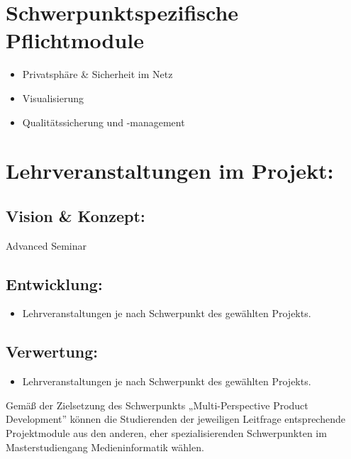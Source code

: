 \section*{Schwerpunktspezifische
Pflichtmodule}\label{schwerpunktspezifische-pflichtmodule-1}

\begin{itemize}
\item
  Privatsphäre \& Sicherheit im Netz
\item
  Visualisierung
\item
  Qualitätssicherung und -management
\end{itemize}

\section*{Lehrveranstaltungen im
Projekt:}\label{lehrveranstaltungen-im-projekt-1}

\subsection*{Vision \& Konzept:}\label{vision-konzept-1}

Advanced Seminar

\subsection*{Entwicklung:}\label{entwicklung-1}

\begin{itemize}
\tightlist
\item
  Lehrveranstaltungen je nach Schwerpunkt des gewählten Projekts.
\end{itemize}

\subsection*{Verwertung:}\label{verwertung-1}

\begin{itemize}
\tightlist
\item
  Lehrveranstaltungen je nach Schwerpunkt des gewählten Projekts.
\end{itemize}

Gemäß der Zielsetzung des Schwerpunkts „Multi-Perspective Product
Development'' können die Studierenden der jeweiligen Leitfrage
entsprechende Projektmodule aus den anderen, eher spezialisierenden
Schwerpunkten im Masterstudiengang Medieninformatik wählen.

